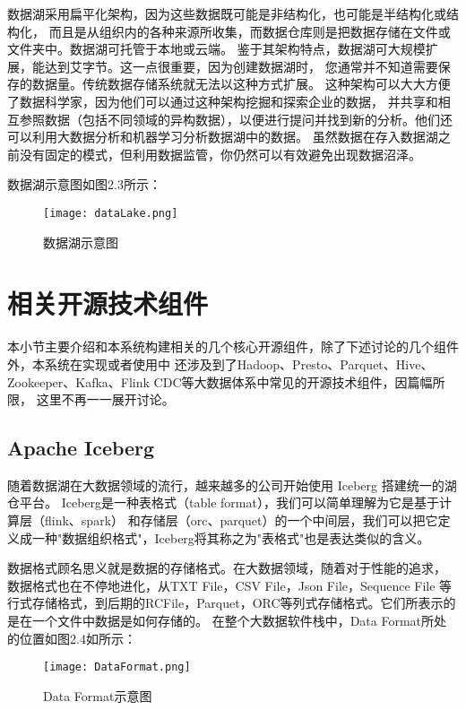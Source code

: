 数据湖采用扁平化架构，因为这些数据既可能是非结构化，也可能是半结构化或结构化，
而且是从组织内的各种来源所收集，而数据仓库则是把数据存储在文件或文件夹中。数据湖可托管于本地或云端。
鉴于其架构特点，数据湖可大规模扩展，能达到艾字节。这一点很重要，因为创建数据湖时，
您通常并不知道需要保存的数据量。传统数据存储系统就无法以这种方式扩展。
这种架构可以大大方便了数据科学家，因为他们可以通过这种架构挖掘和探索企业的数据，
并共享和相互参照数据（包括不同领域的异构数据），以便进行提问并找到新的分析。他们还可以利用大数据分析和机器学习分析数据湖中的数据。
虽然数据在存入数据湖之前没有固定的模式，但利用数据监管，你仍然可以有效避免出现数据沼泽。

数据湖示意图如图2.3所示：

\begin{figure}[h]
  \centering
  \texttt{[image: dataLake.png]}
  \caption{数据湖示意图}
  \label{fig:badge}
\end{figure}

\section{相关开源技术组件}

本小节主要介绍和本系统构建相关的几个核心开源组件，除了下述讨论的几个组件外，本系统在实现或者使用中
还涉及到了Hadoop、Presto、Parquet、Hive、Zookeeper、Kafka、Flink CDC等大数据体系中常见的开源技术组件，因篇幅所限，
这里不再一一展开讨论。

\subsection{Apache Iceberg}

随着数据湖在大数据领域的流行，越来越多的公司开始使用 Iceberg 搭建统一的湖仓平台。
Iceberg是一种表格式（table format），我们可以简单理解为它是基于计算层（flink、spark）
和存储层（orc、parquet）的一个中间层，我们可以把它定义成一种"数据组织格式"，Iceberg将其称之为"表格式"也是表达类似的含义。

数据格式顾名思义就是数据的存储格式。在大数据领域，随着对于性能的追求，
数据格式也在不停地进化，从TXT File，CSV File，Json File，Sequence File
等行式存储格式，到后期的RCFile，Parquet，ORC等列式存储格式。它们所表示的是在一个文件中数据是如何存储的。
在整个大数据软件栈中，Data Format所处的位置如图2.4如所示：

\begin{figure}[h]
  \centering
  \texttt{[image: DataFormat.png]}
  \caption{Data Format示意图}
  \label{fig:badge}
\end{figure}

